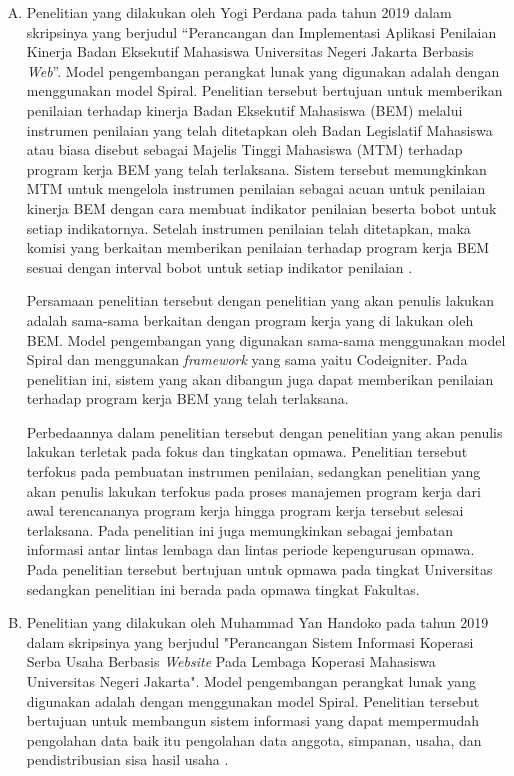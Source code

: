 \begin{enumerate}[A.]
	\item Penelitian yang dilakukan oleh Yogi Perdana pada tahun 2019 dalam skripsinya yang berjudul “Perancangan dan Implementasi Aplikasi Penilaian Kinerja Badan Eksekutif Mahasiswa Universitas Negeri Jakarta Berbasis \emph{Web}”. Model pengembangan perangkat lunak yang digunakan adalah dengan menggunakan model Spiral. Penelitian tersebut bertujuan untuk memberikan penilaian terhadap kinerja Badan Eksekutif Mahasiswa (BEM) melalui instrumen penilaian yang telah ditetapkan oleh Badan Legislatif Mahasiswa atau biasa disebut sebagai Majelis Tinggi Mahasiswa (MTM) terhadap program kerja BEM yang telah terlaksana. Sistem tersebut memungkinkan MTM untuk mengelola instrumen penilaian sebagai acuan untuk penilaian kinerja BEM dengan cara membuat indikator penilaian beserta bobot untuk setiap indikatornya. Setelah instrumen penilaian telah ditetapkan, maka komisi yang berkaitan memberikan penilaian terhadap program kerja BEM sesuai dengan interval bobot untuk setiap indikator penilaian \cite{perdana}.
	
	Persamaan penelitian tersebut dengan penelitian yang akan penulis lakukan adalah sama-sama berkaitan dengan program kerja yang di lakukan oleh BEM. Model pengembangan yang digunakan sama-sama menggunakan model Spiral dan menggunakan \emph{framework} yang sama yaitu Codeigniter. Pada penelitian ini, sistem yang akan dibangun juga dapat memberikan penilaian terhadap program kerja BEM yang telah terlaksana.
	
	Perbedaannya dalam penelitian tersebut dengan penelitian yang akan penulis lakukan terletak pada fokus dan tingkatan opmawa. Penelitian tersebut terfokus pada pembuatan instrumen penilaian, sedangkan penelitian yang akan penulis lakukan terfokus pada proses manajemen program kerja dari awal terencananya program kerja hingga program kerja tersebut selesai terlaksana. Pada penelitian ini juga memungkinkan sebagai jembatan informasi antar lintas lembaga dan lintas periode kepengurusan opmawa. Pada penelitian tersebut bertujuan untuk opmawa pada tingkat Universitas sedangkan penelitian ini berada pada opmawa tingkat Fakultas.
	
	\item Penelitian yang dilakukan oleh Muhammad Yan Handoko pada tahun 2019 dalam skripsinya yang berjudul "Perancangan Sistem Informasi Koperasi Serba Usaha Berbasis \textit{Website} Pada Lembaga Koperasi Mahasiswa Universitas Negeri Jakarta". Model pengembangan perangkat lunak yang digunakan adalah dengan menggunakan model Spiral. Penelitian tersebut bertujuan untuk membangun sistem informasi yang dapat mempermudah pengolahan data baik itu pengolahan data anggota, simpanan, usaha, dan pendistribusian sisa hasil usaha \cite{handoko}. 
	

\end{enumerate}
